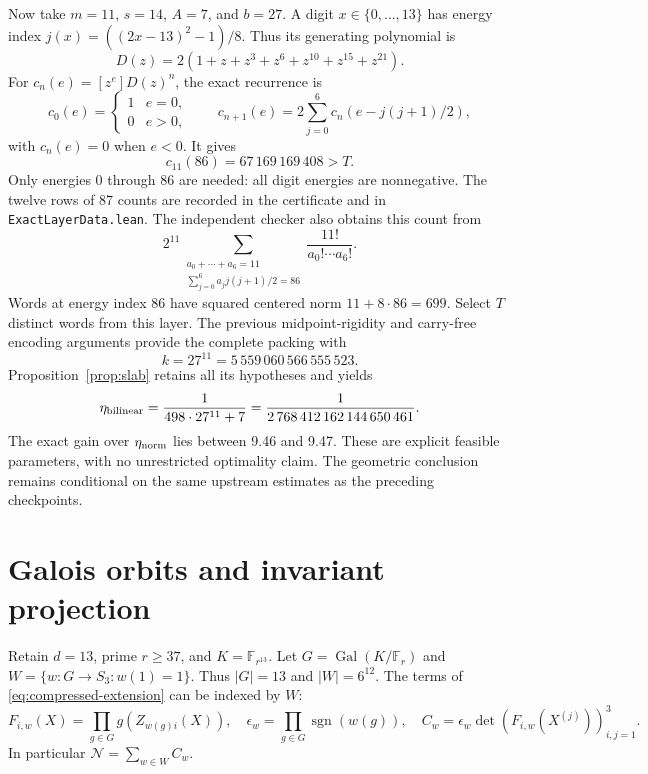 \documentclass[11pt]{article}
\begin{document}
Now take \(m=11\), \(s=14\), \(A=7\), and \(b=27\). A digit
\(x\in\{0,\ldots,13\}\) has energy index
\(j(x)=((2x-13)^2-1)/8\). Thus its generating polynomial is
\[
 D(z)=2(1+z+z^3+z^6+z^{10}+z^{15}+z^{21}).
\]
For \(c_n(e)=[z^e]D(z)^n\), the exact recurrence is
\[
 c_0(e)=\begin{cases}1&e=0,\\0&e>0,\end{cases}
 \qquad
 c_{n+1}(e)=2\sum_{j=0}^6 c_n(e-j(j+1)/2),
\]
with \(c_n(e)=0\) when \(e<0\). It gives
\[
 c_{11}(86)=67\,169\,169\,408>T.
\]
Only energies 0 through 86 are needed: all digit energies are
nonnegative. The twelve rows of 87 counts are recorded in the
certificate and in \texttt{ExactLayerData.lean}. The independent
checker also obtains this count from
\[
 2^{11}\!\!\sum_{\substack{a_0+\cdots+a_6=11\\
                   \sum_{j=0}^6 a_jj(j+1)/2=86}}
       \frac{11!}{a_0!\cdots a_6!}.
\]
Words at energy index 86 have squared centered norm
\(11+8\cdot86=699\). Select \(T\) distinct words from this layer.
The previous midpoint-rigidity and carry-free encoding arguments
provide the complete packing with
\[
 k=27^{11}=5\,559\,060\,566\,555\,523.
\]
Proposition~\ref{prop:slab} retains all its hypotheses and yields
\[
 \eta_{\rm bilinear}=\frac1{498\cdot27^{11}+7}
     =\frac1{2\,768\,412\,162\,144\,650\,461}.
\]
The exact gain over \(\eta_{\rm norm}\) lies between 9.46 and 9.47.
These are explicit feasible parameters, with no unrestricted
optimality claim. The geometric conclusion remains conditional on
the same upstream estimates as the preceding checkpoints.

\section{Galois orbits and invariant projection}\label{sec:frobenius}
Retain \(d=13\), prime \(r\ge37\), and \(K=\mathbb F_{r^{13}}\).
Let \(G=\operatorname{Gal}(K/\mathbb F_r)\) and
\(W=\{w:G\to S_3:w(1)=1\}\). Thus \(|G|=13\) and \(|W|=6^{12}\).
The terms of \eqref{eq:compressed-extension} can be indexed by \(W\):
\[
 F_{i,w}(X)=\prod_{g\in G}g(Z_{w(g)i}(X)),\quad
 \epsilon_w=\prod_{g\in G}\operatorname{sgn}(w(g)),\quad
 C_w=\epsilon_w\det(F_{i,w}(X^{(j)}))_{i,j=1}^3.
\]
In particular \(\mathcal N=\sum_{w\in W}C_w\).
\end{document}

